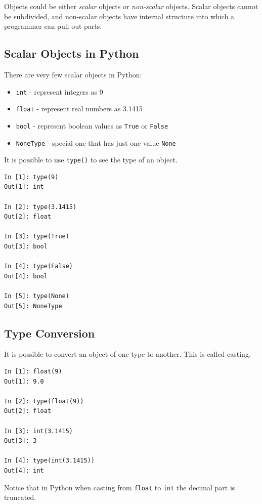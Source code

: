 \documentclass[a4paper]{article}
\newcommand{\inlinecode}{\texttt}
\begin{document}
Objects could be either \textit{scalar} objects or \textit{non-scalar} objects.
Scalar objects cannot be subdivided, and non-scalar objects have internal
structure into which a programmer can pull out parts.

\subsection{Scalar Objects in Python}

There are very few scalar objects in Python:

\begin{itemize}
  \item \inlinecode{int} - represent integers as 9
  \item \inlinecode{float} - represent real numbers as 3.1415
  \item \inlinecode{bool} - represent boolean values as \inlinecode{True} or
        \inlinecode{False}
  \item \inlinecode{NoneType} - special one that has just one value
        \inlinecode{None}
\end{itemize}

It is possible to use \inlinecode{type()} to see the type of an object.

\begin{lstlisting}
In [1]: type(9)
Out[1]: int

In [2]: type(3.1415)
Out[2]: float

In [3]: type(True)
Out[3]: bool

In [4]: type(False)
Out[4]: bool

In [5]: type(None)
Out[5]: NoneType
\end{lstlisting}

\subsection{Type Conversion}

It is possible to convert an object of one type to another. This is called
casting.

\begin{lstlisting}
In [1]: float(9)
Out[1]: 9.0

In [2]: type(float(9))
Out[2]: float

In [3]: int(3.1415)
Out[3]: 3

In [4]: type(int(3.1415))
Out[4]: int
\end{lstlisting}

Notice that in Python when casting from \inlinecode{float} to \inlinecode{int}
the decimal part is truncated.
\end{document}
